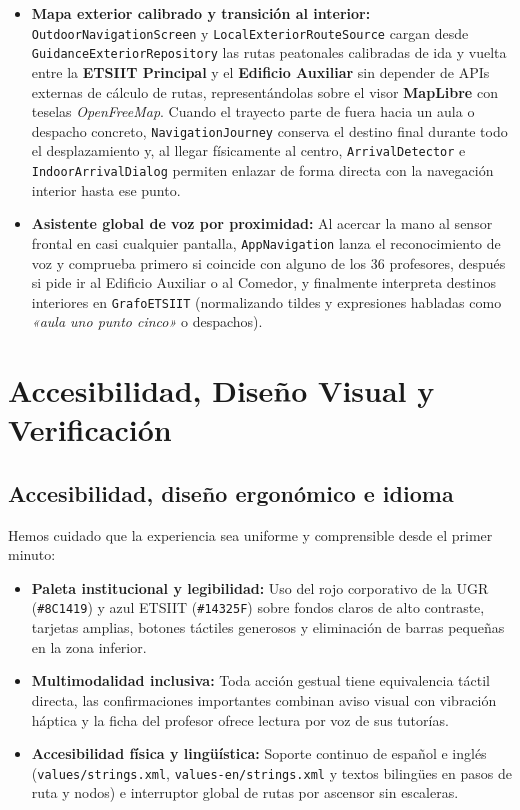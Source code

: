 \documentclass[11pt,a4paper]{article}
\begin{document}
\begin{itemize}[leftmargin=1.8em]
    \vspace{0.2cm}
    \item \textbf{Mapa exterior calibrado y transición al interior:} \texttt{OutdoorNavigationScreen} y \texttt{LocalExteriorRouteSource} cargan desde \texttt{GuidanceExteriorRepository} las rutas peatonales calibradas de ida y vuelta entre la \textbf{ETSIIT Principal} y el \textbf{Edificio Auxiliar} sin depender de APIs externas de cálculo de rutas, representándolas sobre el visor \textbf{MapLibre} con teselas \textit{OpenFreeMap}. Cuando el trayecto parte de fuera hacia un aula o despacho concreto, \texttt{NavigationJourney} conserva el destino final durante todo el desplazamiento y, al llegar físicamente al centro, \texttt{ArrivalDetector} e \texttt{IndoorArrivalDialog} permiten enlazar de forma directa con la navegación interior hasta ese punto.
    \vspace{0.2cm}
    \item \textbf{Asistente global de voz por proximidad:} Al acercar la mano al sensor frontal en casi cualquier pantalla, \texttt{AppNavigation} lanza el reconocimiento de voz y comprueba primero si coincide con alguno de los 36 profesores, después si pide ir al Edificio Auxiliar o al Comedor, y finalmente interpreta destinos interiores en \texttt{GrafoETSIIT} (normalizando tildes y expresiones habladas como \textit{«aula uno punto cinco»} o despachos).
\end{itemize}

\vspace{0.4cm}
\section{Accesibilidad, Diseño Visual y Verificación}

\subsection{Accesibilidad, diseño ergonómico e idioma}
Hemos cuidado que la experiencia sea uniforme y comprensible desde el primer minuto:
\begin{itemize}[leftmargin=1.8em]
    \item \textbf{Paleta institucional y legibilidad:} Uso del rojo corporativo de la UGR (\texttt{\#8C1419}) y azul ETSIIT (\texttt{\#14325F}) sobre fondos claros de alto contraste, tarjetas amplias, botones táctiles generosos y eliminación de barras pequeñas en la zona inferior.
    \item \textbf{Multimodalidad inclusiva:} Toda acción gestual tiene equivalencia táctil directa, las confirmaciones importantes combinan aviso visual con vibración háptica y la ficha del profesor ofrece lectura por voz de sus tutorías.
    \item \textbf{Accesibilidad física y lingüística:} Soporte continuo de español e inglés (\texttt{values/strings.xml}, \texttt{values-en/strings.xml} y textos bilingües en pasos de ruta y nodos) e interruptor global de rutas por ascensor sin escaleras.
\end{itemize}
\end{document}
